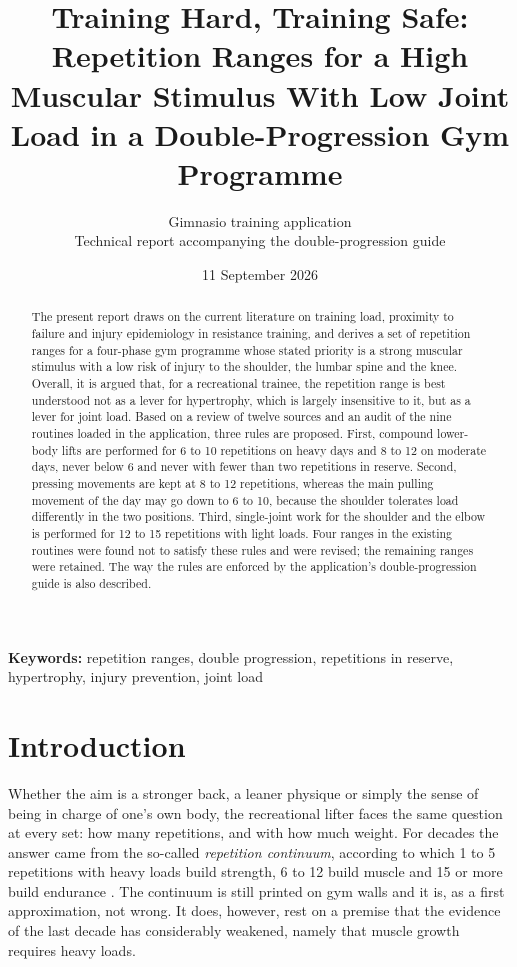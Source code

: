 \documentclass[11pt,a4paper]{article}
\title{\textbf{Training Hard, Training Safe: Repetition Ranges for a High Muscular Stimulus With Low Joint Load in a Double-Progression Gym Programme}}
\author{Gimnasio training application\\[2pt] \small Technical report accompanying the double-progression guide}
\date{11 September 2026}
\begin{document}
\maketitle

\begin{abstract}
\noindent The present report draws on the current literature on training load, proximity to failure and injury epidemiology in resistance training, and derives a set of repetition ranges for a four-phase gym programme whose stated priority is a strong muscular stimulus with a low risk of injury to the shoulder, the lumbar spine and the knee. Overall, it is argued that, for a recreational trainee, the repetition range is best understood not as a lever for hypertrophy, which is largely insensitive to it, but as a lever for joint load. Based on a review of twelve sources and an audit of the nine routines loaded in the application, three rules are proposed. First, compound lower-body lifts are performed for 6 to 10 repetitions on heavy days and 8 to 12 on moderate days, never below 6 and never with fewer than two repetitions in reserve. Second, pressing movements are kept at 8 to 12 repetitions, whereas the main pulling movement of the day may go down to 6 to 10, because the shoulder tolerates load differently in the two positions. Third, single-joint work for the shoulder and the elbow is performed for 12 to 15 repetitions with light loads. Four ranges in the existing routines were found not to satisfy these rules and were revised; the remaining ranges were retained. The way the rules are enforced by the application's double-progression guide is also described.
\end{abstract}

\noindent\textbf{Keywords:} repetition ranges, double progression, repetitions in reserve, hypertrophy, injury prevention, joint load

\section*{Introduction}

Whether the aim is a stronger back, a leaner physique or simply the sense of being in charge of one's own body, the recreational lifter faces the same question at every set: how many repetitions, and with how much weight. For decades the answer came from the so-called \emph{repetition continuum}, according to which 1 to 5 repetitions with heavy loads build strength, 6 to 12 build muscle and 15 or more build endurance \citep{acsm2009}. The continuum is still printed on gym walls and it is, as a first approximation, not wrong. It does, however, rest on a premise that the evidence of the last decade has considerably weakened, namely that muscle growth requires heavy loads.
\end{document}
